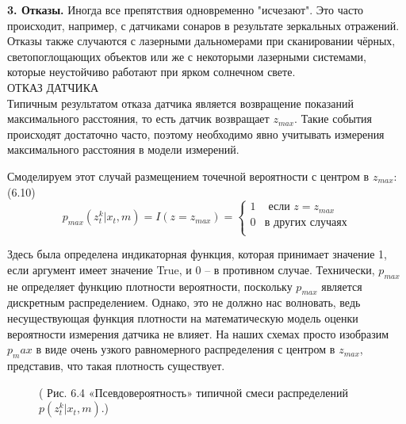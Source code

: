 \documentclass[10pt,a4paper]{article}
\begin{document}
\textbf{3. Отказы.} Иногда все препятствия одновременно "исчезают". Это часто происходит, например, с датчиками сонаров в результате зеркальных отражений. 
Отказы также случаются с лазерными дальномерами при сканировании чёрных, светопоглощающих объектов или же с некоторыми лазерными системами, которые неустойчиво работают при ярком солнечном свете.\\ 
ОТКАЗ ДАТЧИКА \\
Типичным результатом отказа датчика является возвращение показаний максимального расстояния, то есть датчик возвращает $z_{max}$. Такие события происходят достаточно часто, поэтому необходимо явно учитывать измерения максимального расстояния в модели измерений.

Смоделируем этот случай размещением точечной вероятности с центром в $z_{max}$:\\

(6.10)
\begin{equation*}
p_{max}(z_t^k | x_t, m)=I(z=z_{max})=\left\{
\begin{array}{ll}
1 & \mbox{ если } z=z_{max}\\
0 & \mbox{в других случаях}\\
\end{array}
\right.
\end{equation*}

Здесь была определена индикаторная функция, которая принимает значение 1, если аргумент имеет значение True, и 0 – в противном случае. Технически, $p_{max}$ не определяет функцию плотности вероятности, поскольку $p_{max}$ является дискретным распределением. Однако, это не должно нас волновать, ведь несуществующая функция плотности на математическую модель оценки вероятности измерения датчика не влияет. На наших схемах просто изобразим $p_max$ в виде очень узкого равномерного распределения с центром в $z_{max}$, представив, что такая плотность существует.

\begin{figure}[H]
	\caption{ (  Рис. 6.4  «Псевдовероятность» типичной смеси распределений $p(z_t^k | x_t, m)$.)}
	\label{fig:64orig}
\end{figure}
\end{document}
